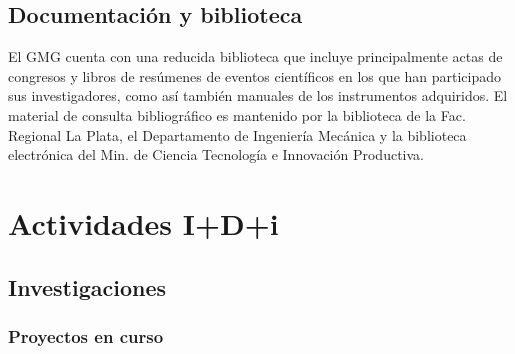 \documentclass[a4paper,11pt,twoside,final,titlepage,onecolumn,openright]{report}
\begin{document}
\section{Documentación y biblioteca}

El GMG cuenta con una reducida biblioteca que incluye principalmente actas de congresos y libros de resúmenes de eventos científicos en los que han participado sus investigadores, como así también manuales de los instrumentos adquiridos. El material de consulta bibliográfico es mantenido por la biblioteca de la Fac. Regional La Plata, el Departamento de Ingeniería Mecánica y la biblioteca electrónica del Min. de Ciencia Tecnología e Innovación Productiva. 

\chapter{Actividades I+D+i}

\section{Investigaciones}

\subsection{Proyectos en curso}
\end{document}
